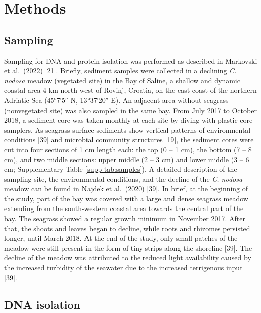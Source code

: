 \documentclass[
  12 pt,
]{article}
\begin{document}
\hypertarget{methods}{%
\section{Methods}\label{methods}}

\hypertarget{sampling}{%
\subsection{Sampling}\label{sampling}}

Sampling for DNA and protein isolation was performed as described in Markovski et al.~(2022) {[}21{]}. Briefly, sediment samples were collected in a declining \emph{C. nodosa} meadow (vegetated site) in the Bay of Saline, a shallow and dynamic coastal area 4 \si{\km} north-west of Rovinj, Croatia, on the east coast of the northern Adriatic Sea (\ang{45;7;5} N, \ang{13;37;20} E). An adjacent area without seagrass (nonvegetated site) was also sampled in the same bay. From July 2017 to October 2018, a sediment core was taken monthly at each site by diving with plastic core samplers. As seagrass surface sediments show vertical patterns of environmental conditions {[}39{]} and microbial community structures {[}19{]}, the sediment cores were cut into four sections of 1 \si{\cm} length each: the top (0 -- 1 \si{\cm}), the bottom (7 -- 8 \si{\cm}), and two middle sections: upper middle (2 -- 3 \si{\cm}) and lower middle (3 -- 6 \si{\cm}; Supplementary Table \ref{supp-tab:samples}). A detailed description of the sampling site, the environmental conditions, and the decline of the \emph{C. nodosa} meadow can be found in Najdek et al.~(2020) {[}39{]}. In brief, at the beginning of the study, part of the bay was covered with a large and dense seagrass meadow extending from the south-western coastal area towards the central part of the bay. The seagrass showed a regular growth minimum in November 2017. After that, the shoots and leaves began to decline, while roots and rhizomes persisted longer, until March 2018. At the end of the study, only small patches of the meadow were still present in the form of tiny strips along the shoreline {[}39{]}. The decline of the meadow was attributed to the reduced light availability caused by the increased turbidity of the seawater due to the increased terrigenous input {[}39{]}.

\hypertarget{dna-isolation}{%
\subsection{DNA isolation}\label{dna-isolation}}
\end{document}
